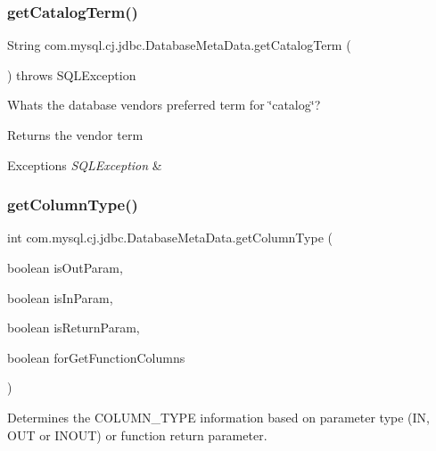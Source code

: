 \subsubsection{\texorpdfstring{get\+Catalog\+Term()}{getCatalogTerm()}}
{\footnotesize\ttfamily String com.\+mysql.\+cj.\+jdbc.\+Database\+Meta\+Data.\+get\+Catalog\+Term (\begin{DoxyParamCaption}{ }\end{DoxyParamCaption}) throws S\+Q\+L\+Exception}

What\textquotesingle{}s the database vendor\textquotesingle{}s preferred term for \char`\"{}catalog\char`\"{}?

\begin{DoxyReturn}{Returns}
the vendor term 
\end{DoxyReturn}

\begin{DoxyExceptions}{Exceptions}
{\em S\+Q\+L\+Exception} & \\
\hline
\end{DoxyExceptions}
\mbox{\label{classcom_1_1mysql_1_1cj_1_1jdbc_1_1_database_meta_data_ae9c66750a6c3a4441b531d16f552a535}} 
\subsubsection{\texorpdfstring{get\+Column\+Type()}{getColumnType()}}
{\footnotesize\ttfamily int com.\+mysql.\+cj.\+jdbc.\+Database\+Meta\+Data.\+get\+Column\+Type (\begin{DoxyParamCaption}\item[{boolean}]{is\+Out\+Param,  }\item[{boolean}]{is\+In\+Param,  }\item[{boolean}]{is\+Return\+Param,  }\item[{boolean}]{for\+Get\+Function\+Columns }\end{DoxyParamCaption})\hspace{0.3cm}{\ttfamily [protected]}}

Determines the C\+O\+L\+U\+M\+N\+\_\+\+T\+Y\+PE information based on parameter type (IN, O\+UT or I\+N\+O\+UT) or function return parameter.


